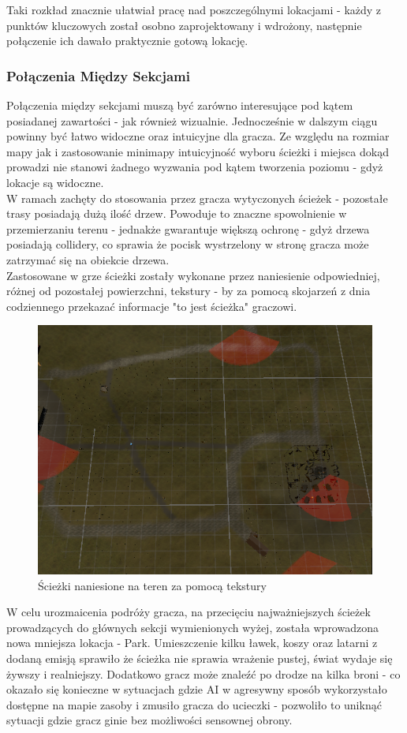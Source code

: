 Taki rozkład znacznie ułatwiał pracę nad poszczególnymi lokacjami - każdy z punktów kluczowych został osobno zaprojektowany i wdrożony, następnie połączenie ich dawało praktycznie gotową lokację.
\subsubsection{Połączenia Między Sekcjami}

Połączenia między sekcjami muszą być zarówno interesujące pod kątem posiadanej zawartości - jak również wizualnie.
Jednocześnie w dalszym ciągu powinny być łatwo widoczne oraz intuicyjne dla gracza.
Ze względu na rozmiar mapy  jak i zastosowanie minimapy intuicyjność wyboru ścieżki i miejsca dokąd prowadzi nie stanowi żadnego wyzwania pod kątem tworzenia poziomu - gdyż lokacje są widoczne.\\
W ramach zachęty do stosowania przez gracza wytyczonych ścieżek - pozostałe trasy posiadają dużą ilość drzew.
Powoduje to znaczne spowolnienie w przemierzaniu terenu - jednakże gwarantuje większą ochronę - gdyż drzewa posiadają collidery, co sprawia że pocisk wystrzelony w stronę gracza może zatrzymać się na obiekcie drzewa.\\
Zastosowane w grze ścieżki zostały wykonane przez naniesienie odpowiedniej, różnej od pozostałej powierzchni, tekstury - by za pomocą skojarzeń z dnia codziennego przekazać informacje "to jest ścieżka" graczowi.
\begin{figure}[h]
    \centering
    \includegraphics[width=0.5\linewidth]{Images/paths.png}
    \caption{Ścieżki naniesione na teren za pomocą tekstury}
\end{figure}

W celu urozmaicenia podróży gracza, na przecięciu najważniejszych ścieżek prowadzących do głównych sekcji wymienionych wyżej, została wprowadzona nowa mniejsza lokacja - Park.
Umieszczenie kilku ławek, koszy oraz latarni z dodaną emisją sprawiło że ścieżka nie sprawia wrażenie pustej, świat wydaje się żywszy i realniejszy.
Dodatkowo gracz może znaleźć po drodze na kilka broni - co okazało się konieczne w sytuacjach gdzie AI w agresywny sposób wykorzystało dostępne na mapie zasoby i zmusiło gracza do ucieczki - pozwoliło to uniknąć sytuacji gdzie gracz ginie bez możliwości sensownej obrony.

